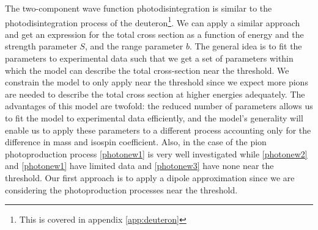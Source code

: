 The two-component wave function photodisintegration is similar to the photodisintegration process of the deuteron\footnote{This is covered in appendix \ref{app:deuteron}}. We can apply a similar approach and get an expression for the total cross section as a function of energy and the strength parameter $S$, and the range parameter $b$. The general idea is to fit the parameters to experimental data such that we get a set of parameters within which the model can describe the total cross-section near the threshold. We constrain the model to only apply near the threshold since we expect more pions are needed to describe the total cross section at higher energies adequately.
The advantages of this model are twofold: the reduced number of parameters allows us to fit the model to experimental data efficiently, and the model's generality will enable us to apply these parameters to a different process accounting only for the difference in mass and isospin coefficient. Also, in the case of the pion photoproduction process \eqref{photonew1} is very well investigated while \eqref{photonew2} and \eqref{photonew1} have limited data and \eqref{photonew3} have none near the threshold. Our first approach is to apply a dipole approximation since we are considering the photoproduction processes near the threshold. 
